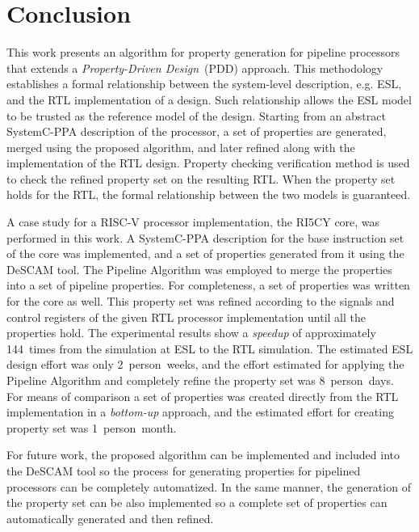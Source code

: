 \chapter{Conclusion}
\label{chapter:conclusion}

This work presents an algorithm for property generation for pipeline processors that extends a \textit{Property-Driven Design}~(PDD) approach. This methodology establishes a formal relationship between the system-level description, e.g. ESL, and the RTL implementation of a design. Such relationship allows the ESL model to be trusted as the reference model of the design. Starting from an abstract SystemC-PPA description of the processor, a set of properties are generated, merged using the proposed algorithm, and later refined along with the implementation of the RTL design. Property checking verification method is used to check the refined property set on the resulting RTL. When the property set holds for the RTL, the formal relationship between the two models is guaranteed.

A case study for a RISC-V processor implementation, the RI5CY core, was performed in this work. A SystemC-PPA description for the base instruction set of the core was implemented, and a set of properties generated from it using the DeSCAM tool. The Pipeline Algorithm was employed to merge the properties into a set of pipeline properties. For completeness, a set of \SSQED{} properties was written for the core as well. This property set was refined according to the signals and control registers of the given RTL processor implementation until all the properties hold. The experimental results show a \textit{speedup} of approximately 144~times from the simulation at ESL to the RTL simulation. The estimated ESL design effort was only 2~person~weeks, and the effort estimated for applying the Pipeline Algorithm and completely refine the property set was 8~person~days. For means of comparison a set of properties was created directly from the RTL implementation in a \textit{bottom-up} approach, and the estimated effort for creating property set was 1~person~month.

For future work, the proposed algorithm can be implemented and included into the DeSCAM tool so the process for generating properties for pipelined processors can be completely automatized. In the same manner, the generation of the \SSQED{} property set can be also implemented so a complete set of properties can automatically generated and then refined.